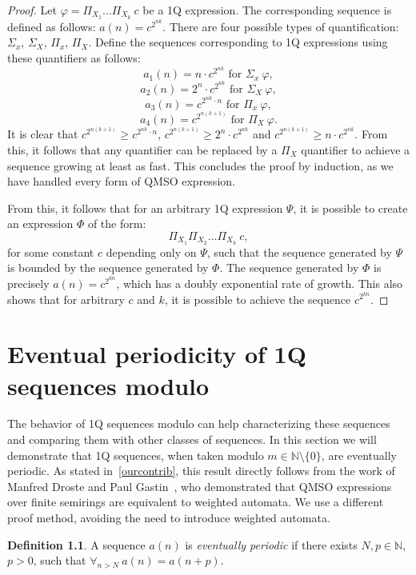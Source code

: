 \documentclass[en]{pracamgr}
\theoremstyle{definition}
\newtheorem{definition}{Definition}[section]
\begin{document}
\begin{proof}
    Let $\varphi = \Pi_{X_1}\ldots \Pi_{X_k} \ c$ be a 1Q expression. The corresponding sequence is defined as follows: $a(n) = c^{2^{nk}}$. There are four possible types of quantification: $\Sigma_x$, $\Sigma_X$, $\Pi_x$, $\Pi_X$. Define the sequences corresponding to 1Q expressions using these quantifiers as follows:
    $$a_1(n) = n \cdot c^{2^{nk}} \text{ for } \Sigma_x \ \varphi,$$
    $$a_2(n) = 2^n \cdot c^{2^{nk}} \text{ for } \Sigma_X \ \varphi,$$
    $$a_3(n) = c^{2^{nk} \cdot n} \text{ for } \Pi_x \ \varphi,$$
    $$a_4(n) = c^{2^{n(k+1)}} \text{ for } \Pi_X \ \varphi.$$
    It is clear that $c^{2^{n(k+1)}} \geq c^{2^{nk} \cdot n}$, $c^{2^{n(k+1)}} \geq 2^n \cdot c^{2^{nk}}$ and $c^{2^{n(k+1)}} \geq n \cdot c^{2^{nk}}$. From this, it follows that any quantifier can be replaced by a $\Pi_X$ quantifier to achieve a sequence growing at least as fast. This concludes the proof by induction, as we have handled every form of QMSO expression.

    From this, it follows that for an arbitrary 1Q expression $\varPsi$, it is possible to create an expression $\varPhi$ of the form:
    $$\Pi_{X_1}\Pi_{X_2}\ldots \Pi_{X_k} \ c,$$
    for some constant $c$ depending only on $\varPsi$, such that the sequence generated by $\varPsi$ is bounded by the sequence generated by $\varPhi$. The sequence generated by $\varPhi$ is precisely $a(n) = c^{2^{kn}}$, which has a doubly exponential rate of growth. This also shows that for arbitrary $c$ and $k$, it is possible to achieve the sequence $c^{2^{kn}}$.
\end{proof}

\chapter{Eventual periodicity of 1Q sequences modulo}
\label{Sec1QFiniteSemirings}
The behavior of 1Q sequences modulo can help characterizing these sequences and comparing them with other classes of sequences. In this section we will demonstrate that 1Q sequences, when taken modulo $m \in \mathbb{N} \setminus \{0\}$, are eventually periodic. As stated in~\cref{ourcontrib}, this result directly follows from the work of Manfred Droste and Paul Gastin~\cite{DrosteG07}, who demonstrated that QMSO expressions over finite semirings are equivalent to weighted automata. We use a different proof method, avoiding the need to introduce weighted automata.

\begin{definition}
    A sequence $a(n)$ is \textit{eventually periodic} if there exists $N, p \in \mathbb{N}$, $p > 0$, such that $\forall_{n > N} \ a(n) = a(n+p)$.
\end{definition}
\end{document}
